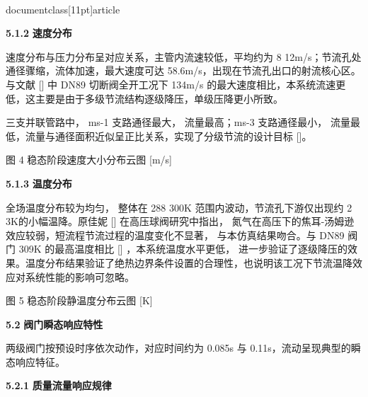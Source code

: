 \\documentclass[11pt]{article}
\begin{document}
\par
\textbf{5.1.2    }\textbf{速度分布}\par

速度分布与压力分布呈对应关系，主管内流速较低，平均约为 8 12m/s；节流孔处通径骤缩，流体加速，最大速度可达 58.6m/s，出现在节流孔出口的射流核心区。与文献 [\cite{fe880629_9ce4_4876_a173_e24a97d827f4_基于数字孪生的管道阀门监测技术研究_谭宗豪}]   中 DN89 切断阀全开工况下 134m/s 的最大速度相比，本系统流速更低，这主要是由于多级节流结构逐级降压，单级压降更小所致。\par

三支并联管路中， ms-1 支路通径最大， 流量最高；ms-3 支路通径最小， 流量最低，流量与通径面积近似呈正比关系，实现了分级节流的设计目标 [\cite{fe880629_9ce4_4876_a173_e24a97d827f4_基于数字孪生的管道阀门监测技术研究_谭宗豪}]。\par

\par
\par
图 4    稳态阶段速度大小分布云图 [m/s]\par

\par
\textbf{5.1.3}\textbf{    }\textbf{温度分布}\par

全场温度分布较为均匀， 整体在 288 300K 范围内波动，节流孔下游仅出现约 2 3K的小幅温降。原佳妮 [\cite{fe880629_9ce4_4876_a173_e24a97d827f4_基于数字孪生的管道阀门监测技术研究_谭宗豪}]  在高压球阀研究中指出， 氮气在高压下的焦耳-汤姆逊效应较弱，短流程节流过程的温度变化不显著， 与本仿真结果吻合。与 DN89 阀门 309K 的最高温度相比 [\cite{fe880629_9ce4_4876_a173_e24a97d827f4_基于数字孪生的管道阀门监测技术研究_谭宗豪}] ，本系统温度水平更低， 进一步验证了逐级降压的效果。温度分布结果验证了绝热边界条件设置的合理性，也说明该工况下节流温降效应对系统性能的影响可忽略。\par

\par
图 5    稳态阶段静温度分布云图 [K]\par

\par
\par
\textbf{5.2    }\textbf{阀门瞬态响应特性}\par

两级阀门按预设时序依次动作，对应时间约为 0.085s 与 0.11s，流动呈现典型的瞬态响应特征。\par

\par
\textbf{5.2.1    }\textbf{质量流量响应规律}\par
\end{document}
